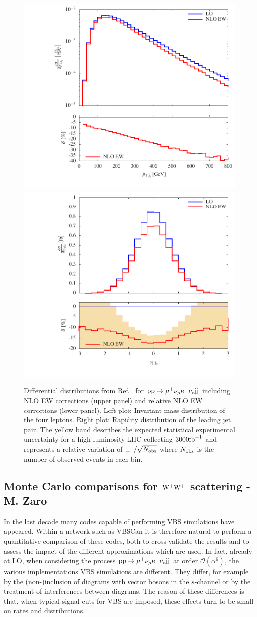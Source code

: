 \begin{figure}
\includegraphics[width=.47\textwidth]{WG1_plots/histogram_transverse_momentum_j1_ew}
\includegraphics[width=.47\textwidth]{WG1_plots/histogram_rapidity_j1j2_ew}
\caption{Differential distributions from Ref.~\cite{Biedermann:2016yds} for ${\rm p}{\rm p}\to\mu^+\nu_\mu{\rm e}^+\nu_{\rm e}{\rm j}{\rm j}$ including NLO EW corrections (upper panel) and relative NLO EW corrections (lower panel).
Left plot: Invariant-mass distribution of the four leptons.
Right plot: Rapidity distribution of the leading jet pair.
The yellow band describes the expected statistical experimental uncertainty for a high-luminosity LHC collecting $3000{\rm fb}^{-1}$ and represents a relative variation of $\pm 1/\sqrt{N_{\rm obs}}$ where $N_{\rm obs}$ is the number of observed events in each bin.}
\label{fig:VBSEW}
\end{figure}

\subsection{Monte Carlo comparisons for ${\rm W^+ W^+}$ scattering - M. Zaro}
In the last decade many codes capable of performing VBS simulations have appeared.
Within a network such as VBSCan it is therefore natural to perform 
a quantitative comparison of these codes, both to cross-validate the results and to assess the impact of the different approximations which are used.
In fact, already at LO, when considering the process ${\rm p}{\rm p}\to\mu^+\nu_\mu{\rm e}^+\nu_{\rm e}{\rm j}{\rm j}$ at order $\mathcal O (\alpha^6)$, the various implementations VBS simulations are different.
They differ, for example
by the (non-)inclusion of diagrams with vector bosons in the $s$-channel or by the treatment of interferences between diagrams.
The reason of these differences is that, 
when typical signal cuts for VBS are imposed, these effects turn to be small on rates and distributions.

